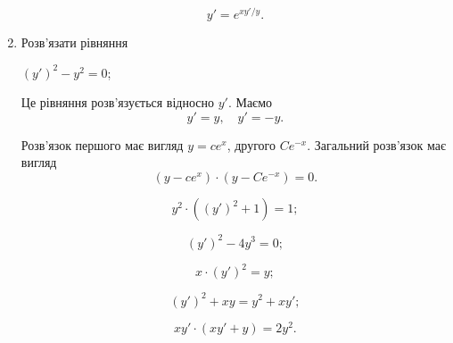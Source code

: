 \begin{enumerate}
\begin{multicols}{2}
		\begin{problem}
			\[y'=e^{xy'/y}.\]
		\end{problem}
	\end{multicols}

	\item Розв'язати рівняння
	\begin{example}
		$(y')^2 - y^2 = 0$;
	\end{example}

	\begin{solution}
		Це рівняння розв'язується відносно $y'$. Маємо  \[y' = y, \quad y' = - y.\]

		Розв'язок першого має вигляд $y = ce^x$, другого $Ce^{-x}$. Загальний розв'язок має вигляд \[ (y - ce^x)\cdot(y-Ce^{-x})=0.\]
	\end{solution}
	
	\begin{multicols}{2}
		\begin{problem}
			\[y^2\cdot((y')^2+1)=1;\]
		\end{problem}
		
		\begin{problem}
			\[(y')^2-4y^3=0;\]
		\end{problem}
		
		\begin{problem}
			\[x\cdot(y')^2=y;\]
		\end{problem}
		
		\begin{problem}
			\[(y')^2+xy=y^2+xy';\]
		\end{problem}
		
		\begin{problem}
			\[xy'\cdot(xy'+y)=2y^2.\]
		\end{problem}
	\end{multicols}
\end{enumerate}